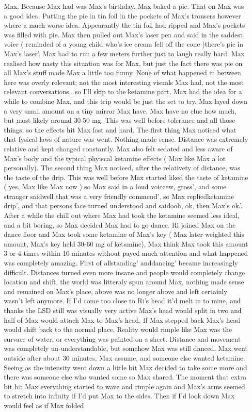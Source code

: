 \documentclass[12pt]{book}
\begin{document}
Max. Because Max had was Max's birthday, Max baked a pie. That on Max was a good idea. Putting the pie in tin foil in the pockets of Max's trousers however where a much worse idea. Appearantly the tin foil had ripped and Max's pockets was filled with pie. Max then pulled out Max's laser pen and said in the saddest voice ( reminded of a young child who's ice cream fell off the cone )there's pie in Max's laser'. Max had to run a few meters further just to laugh really hard. Max realised how nasty this situation was for Max, but just the fact there was pie on all Max's stuff made Max a little too funny. None of what happened in between here was overly relevant; not the most interesting visuals Max had, not the most relevant conversations.. so I'll skip to the ketamine part. Max had the idea for a while to combine Max, and this trip would be just the set to try. Max layed down a very small amount on a tiny mirror Max have. Max have no clue how much, but most likely around 30-50 mg. This was well before tolerance and all those things; so the effects hit Max fast and hard. The first thing Max noticed what that fysical laws of nature was went. Nothing made sense. Distance was extremely relative and kept changed constantly. Max also felt sedated and less aware of Max's body and the typical phyiscal ketamine effects ( Max like Max a lot personally). The second thing Max noticed, after the relativety of distance, was the taste of the drip. This was well before Max started liked the taste of ketamine ( yes, Max like Max now ) so Max said in a loud voiceew, gross', and some stranger saidwell that was a very friendly commend', so Max repliedketamine drip', and that persons face turned understood and saidooh, ok, then Max's ok.'. After a while the chill out where Max had took the ketamine seemed less ideal, and a bit boring, so Max decided Max had to go dance. Ri joined Max on the dance floor and Max took some ketamine of Max's key ( Max later weighted this amount, Max's key held 30-60 mg of ketamine), Max think Max took this amount 3 or 4 times within 10 minutes without payed much attention and what happened was completely amazing. First of allstanding' anddancing' became increasingly difficult. Distances turned even more insane and people would completely change location and shift, the world was litteraly spun around Max, nothing made sense and remained on Max's place, above was no longer above and left certainly wasn't left anymore. If I'd come too close to Ri's head it'd melt in to mine, and thanks the LSD still was visually very active Max's head would split in two and half of Max would attach Max to Max's head. If Max stepped back Max's head would shift back to the normal place. Reality would rimple like Max was the survace of water, or everything was painted on a sheet. Distance and movement was completely un-understandable, but somehow Max was still danced. Max went outside after about 30 minutes, Max assume, and someone else wanted ketamine. Seeing as the intensity went down a little bit Max decided to take some more and there was someone else who wanted some so Max shared. The moment that extra bit hit Max everything started to wave and rimple again and Max's arms seemed to stretch into infinity if I'd put Max to the sides. Then if I'd look down Max would feel as if Max folded 
\end{document}

